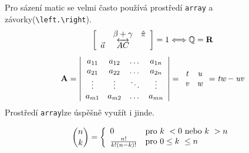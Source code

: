 \documentclass[a4paper,11pt,twocolumn]{article}
\begin{document}
Pro sázení matic se velmi často používá prostředí \verb|array|
a závorky(\verb|\left.\right|).
$$
\left[
\begin{array}{ccc}
 & \beta + \gamma & \hat{\pi}\\
 \vec{a} & \overleftrightarrow{AC}
\end{array}
\right] = 1 \Longleftrightarrow \mathbb {Q} = \mathbf {R}
\\
$$
\[
\mathbf{A} = \left|
\begin{array}{cccc}
     a_{11} & a_{12} & \dots & a_{1n}  \\
     a_{21} & a_{22} & \dots & a_{2n}  \\
     \vdots & \vdots & \ddots & \vdots \\
     a_{m1} & a_{m2} & \dots & a_{mn}
\end{array}
\right| = \begin{array}{cc}
    \emph{t} & \emph{u} \\
     \emph{v} & \emph{w}
\end{array} = \emph{tw} - \emph{uv}
\]
Prostředí \verb!array!lze úspěšně využít i jinde.

\[
\binom {n}{k} = \left\{
\begin{array}{ll}
	0 & $pro $ k~< 0 $ nebo $ k~> n \\
	\frac{n!}{k!(n-k)!} & $pro $ 0 \leq k~\leq n \\
\end{array} \right. 
\]
\end{document}
